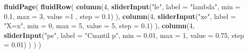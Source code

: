 \documentclass[]{book}
\newenvironment{Shaded}{\begin{snugshade}}{\end{snugshade}}
\newcommand{\DataTypeTok}[1]{\textcolor[rgb]{0.13,0.29,0.53}{#1}}
\newcommand{\DecValTok}[1]{\textcolor[rgb]{0.00,0.00,0.81}{#1}}
\newcommand{\FloatTok}[1]{\textcolor[rgb]{0.00,0.00,0.81}{#1}}
\newcommand{\KeywordTok}[1]{\textcolor[rgb]{0.13,0.29,0.53}{\textbf{#1}}}
\newcommand{\NormalTok}[1]{#1}
\newcommand{\StringTok}[1]{\textcolor[rgb]{0.31,0.60,0.02}{#1}}
\begin{document}
\begin{Shaded}
\begin{Highlighting}[]
\KeywordTok{fluidPage}\NormalTok{(}
\KeywordTok{fluidRow}\NormalTok{(}
  \KeywordTok{column}\NormalTok{(}\DecValTok{4}\NormalTok{,}
         \KeywordTok{sliderInput}\NormalTok{(}\StringTok{"le"}\NormalTok{, }\DataTypeTok{label =} \StringTok{"lambda"}\NormalTok{,}
              \DataTypeTok{min =} \FloatTok{0.1}\NormalTok{, }\DataTypeTok{max =} \DecValTok{3}\NormalTok{, }\DataTypeTok{value =}\DecValTok{1}\NormalTok{ , }\DataTypeTok{step =} \FloatTok{0.1}\NormalTok{)}
\NormalTok{         ),}
  \KeywordTok{column}\NormalTok{(}\DecValTok{4}\NormalTok{,}
          \KeywordTok{sliderInput}\NormalTok{(}\StringTok{"xe"}\NormalTok{, }\DataTypeTok{label =} \StringTok{"X=x"}\NormalTok{,}
                     \DataTypeTok{min =} \DecValTok{0}\NormalTok{, }\DataTypeTok{max =} \DecValTok{5}\NormalTok{, }\DataTypeTok{value =} \DecValTok{5}\NormalTok{, }\DataTypeTok{step =} \FloatTok{0.1}\NormalTok{)}
\NormalTok{         ),}
  \KeywordTok{column}\NormalTok{(}\DecValTok{4}\NormalTok{,}
          \KeywordTok{sliderInput}\NormalTok{(}\StringTok{"pe"}\NormalTok{, }\DataTypeTok{label =} \StringTok{"Cuantil p"}\NormalTok{,}
                     \DataTypeTok{min =} \FloatTok{0.01}\NormalTok{, }\DataTypeTok{max =} \DecValTok{1}\NormalTok{, }\DataTypeTok{value =} \FloatTok{0.75}\NormalTok{, }\DataTypeTok{step =} \FloatTok{0.01}\NormalTok{)}
\NormalTok{         )}
\NormalTok{)}
\NormalTok{)}


\end{Highlighting}
\end{Shaded}
\end{document}
